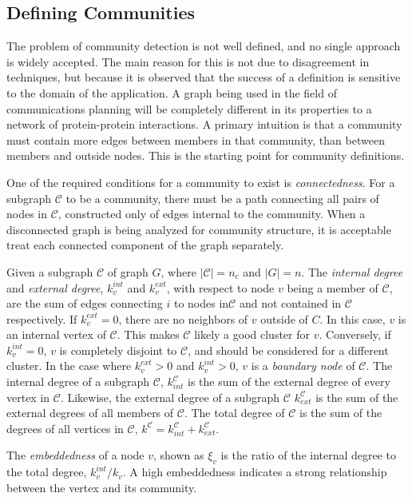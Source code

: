 \subsection{Defining Communities}

The problem of community detection is not well defined, and no single approach is widely accepted. The main reason for this is not due to disagreement in techniques, but because it is observed that the success of a definition is sensitive to the domain of the application. A graph being used in the field of communications planning will be completely different in its properties to a network of protein-protein interactions. A primary intuition is that a community must contain more edges between members in that community, than between members and outside nodes. This is the starting point for community definitions. 

One of the required conditions for a community to exist is \textit{connectedness}. For a subgraph $\mathcal{C}$ to be a community, there must be a path connecting all pairs of nodes in $\mathcal{C}$, constructed only of edges internal to the community. When a disconnected graph is being analyzed for community structure, it is acceptable treat each connected component of the graph separately.

Given a subgraph $\mathcal{C}$ of graph $G$, where $|\mathcal{C}|= n_c$ and $|G|=n$. The \textit{internal degree} and \textit{external degree}, $k^{int}_v$ and $k^{ext}_v$, with respect to node $v$ being a member of $\mathcal{C}$, are the sum of edges connecting $i$ to nodes in$\mathcal{C}$ and not contained in $\mathcal{C}$ respectively. If $k^{ext}_v=0$, there are no neighbors of $v$ outside of $C$. In this case, $v$ is an internal vertex of $\mathcal{C}$. This makes $\mathcal{C}$ likely a good cluster for $v$. Conversely, if $k^{int}_v=0$, $v$ is completely disjoint to $\mathcal{C}$, and should be considered for a different cluster. In the case where $k^{ext}_v>0$ and $k^{int}_v>0$, $v$ is a \textit{boundary node} of $\mathcal{C}$. The internal degree of a subgraph $\mathcal{C}$, $k^{\mathcal{C}}_{int}$ is the sum of the external degree of every vertex in $\mathcal{C}$. Likewise, the external degree of a subgraph $\mathcal{C}$ $k^{\mathcal{C}}_{ext}$ is the sum of the external degrees of all members of $\mathcal{C}$. The total degree of $\mathcal{C}$ is the sum of the degrees of all vertices in $\mathcal{C}$,  $k^\mathcal{C}=k^{\mathcal{C}}_{int}+k^{\mathcal{C}}_{ext}$.

The \textit{embeddedness} of a node $v$, shown as $\xi_v$ is the ratio of the internal degree to the total degree, $k^{int}_v/k_v$. A high embeddedness indicates a strong relationship between the vertex and its community. 

